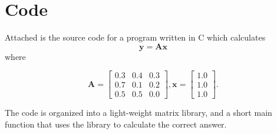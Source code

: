\documentclass{scrartcl}
\begin{document}
\section{Code}

Attached is the source code for a program written in C which calculates
$$ \mathbf{y} = \mathbf{A}\mathbf{x} $$
where

\[
\mathbf{A} =
\left[ \begin{array}{ccc}
0.3 & 0.4 & 0.3 \\
0.7 & 0.1 & 0.2 \\
0.5 & 0.5 & 0.0 \end{array}
\right]
,
\mathbf{x} =
\left[ \begin{array}{c}
1.0 \\
1.0 \\
1.0 \end{array}
\right]
.
\]

The code is organized into a light-weight matrix library, and a short main function that uses the library to calculate the correct answer.
\end{document}
